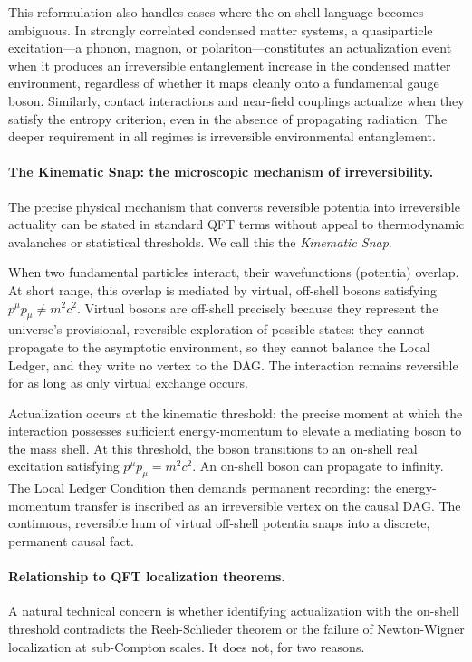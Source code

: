 \documentclass[11pt,a4paper]{article}
\theoremstyle{plain}
\theoremstyle{definition}
\theoremstyle{remark}
\begin{document}
This reformulation also handles cases where the on-shell language becomes
ambiguous. In strongly correlated condensed matter systems, a quasiparticle
excitation---a phonon, magnon, or polariton---constitutes an actualization event
when it produces an irreversible entanglement increase in the condensed matter
environment, regardless of whether it maps cleanly onto a fundamental gauge boson.
Similarly, contact interactions and near-field couplings actualize when they
satisfy the entropy criterion, even in the absence of propagating radiation. The
deeper requirement in all regimes is irreversible environmental entanglement.

\paragraph{The Kinematic Snap: the microscopic mechanism of irreversibility.}
The precise physical mechanism that converts reversible potentia into irreversible
actuality can be stated in standard QFT terms without appeal to thermodynamic
avalanches or statistical thresholds. We call this the \emph{Kinematic Snap}.

When two fundamental particles interact, their wavefunctions (potentia) overlap.
At short range, this overlap is mediated by virtual, off-shell bosons satisfying
$p^{\mu}p_{\mu} \neq m^{2}c^{2}$. Virtual bosons are off-shell precisely because
they represent the universe's provisional, reversible exploration of possible
states: they cannot propagate to the asymptotic environment, so they cannot
balance the Local Ledger, and they write no vertex to the DAG. The interaction
remains reversible for as long as only virtual exchange occurs.

Actualization occurs at the kinematic threshold: the precise moment at which the
interaction possesses sufficient energy-momentum to elevate a mediating boson to
the mass shell. At this threshold, the boson transitions to an on-shell real
excitation satisfying $p^{\mu}p_{\mu} = m^{2}c^{2}$. An on-shell boson can
propagate to infinity. The Local Ledger Condition then demands permanent recording:
the energy-momentum transfer is inscribed as an irreversible vertex on the causal
DAG. The continuous, reversible hum of virtual off-shell potentia snaps into a
discrete, permanent causal fact.

\paragraph{Relationship to QFT localization theorems.}
\label{sec:localization}
A natural technical concern is whether identifying actualization with the on-shell
threshold contradicts the Reeh-Schlieder theorem or the failure of Newton-Wigner
localization at sub-Compton scales. It does not, for two reasons.
\end{document}
